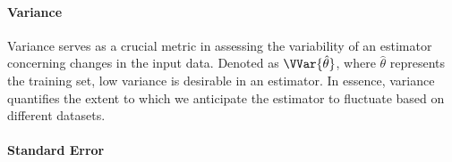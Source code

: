 



        \paragraph{Variance}

            Variance serves as a crucial metric in assessing the variability of an estimator concerning changes in the input data. Denoted as $\VVar{\hat{\theta}}$, where $\hat{\theta}$ represents the training set, low variance is desirable in an estimator. In essence, variance quantifies the extent to which we anticipate the estimator to fluctuate based on different datasets.

        \paragraph{Standard Error}

